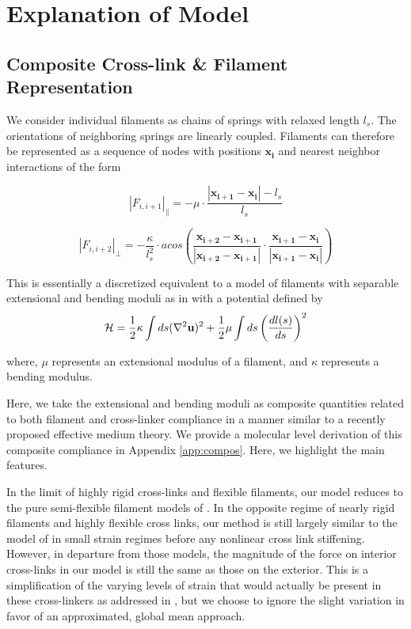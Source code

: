 \documentclass[pre,preprint]{revtex4-1}
\begin{document}
\section{Explanation of Model}

\subsection{Composite Cross-link \& Filament Representation}
We consider individual filaments as chains of springs with relaxed length $l_s$.  The orientations of neighboring springs are linearly coupled. Filaments can therefore be represented as a sequence of nodes with positions $\mathbf{x_i}$ and nearest neighbor interactions of the form

\begin{equation}
|F_{i,i+1}|_{\parallel} = -\mu\cdot\frac{|\mathbf{x_{i+1}}-\mathbf{x_i}|-l_s}{l_s} 
\end{equation}

\begin{equation}
|F_{i,i+2}|_{\perp} = -\frac{\kappa}{l_s^2}\cdot acos\left (\frac{\mathbf{x_{i+2}}-\mathbf{x_{i+1}}}{|\mathbf{x_{i+2}}-\mathbf{x_{i+1}}|} \cdot\frac{\mathbf{x_{i+1}}-\mathbf{x_i}}{|\mathbf{x_{i+1}}-\mathbf{x_i}|} \right ) 
\end{equation}

This is essentially a discretized equivalent to a model of filaments with separable extensional and bending moduli as in \cite{theo_hlm} with a potential defined by
\begin{equation}
{\cal H} =\frac{1}{2}\kappa \int ds(\nabla^2\mathbf{u})^2 + \frac{1}{2}\mu \int ds \left ( \frac{dl(s) }{ds} \right )^2
\end{equation}

where, $\mu$ represents an extensional modulus of a filament, and $\kappa$ represents a bending modulus.   

Here, we take the extensional and bending moduli as composite quantities related to both filament and cross-linker compliance in a manner similar to a recently proposed effective medium theory\cite{theo_crosslinknonlinear}.  We provide a molecular level derivation of this composite compliance in Appendix \ref{app:compos}. Here, we highlight the main features.  

In the limit of highly rigid cross-links and flexible filaments, our model reduces to the pure semi-flexible filament models of \cite{theo_hlm,theo_hlm2}.  In the opposite regime of nearly rigid filaments and highly flexible cross links, our method is still largely similar to the model of \cite{theo_crosslinknonlinear} in small strain regimes before any nonlinear cross link stiffening.  However, in departure from those models, the magnitude of the force on interior cross-links in our model is still the same as those on the exterior.  This is a simplification of the varying levels of strain that would actually be present in these cross-linkers as addressed in \cite{theo_crosslinknonlinear}, but we choose to ignore the slight variation in favor of an approximated, global mean approach.  
\end{document}
